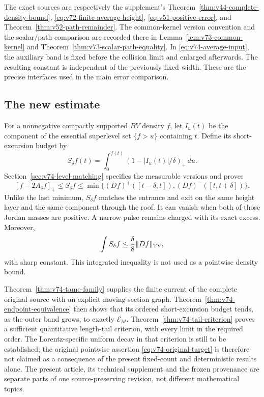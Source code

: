 \documentclass[11pt,reqno]{amsart}
\numberwithin{equation}{section}
\theoremstyle{definition}
\theoremstyle{remark}\newtheorem{remark}[theorem]{Remark}
\begin{document}
The exact sources are respectively the supplement's
Theorem~\ref{thm:v44-complete-density-bound},
\eqref{eq:v72-finite-average-height},
\eqref{eq:v51-positive-error}, and
Theorem~\ref{thm:v52-path-remainder}. The common-kernel version
convention and the scalar/path comparison are recorded there in
Lemma~\ref{lem:v73-common-kernel} and
Theorem~\ref{thm:v73-scalar-path-equality}.
In \eqref{eq:v74-average-input}, the auxiliary band is fixed before
the collision limit and enlarged afterwards. The resulting constant
is independent of the previously fixed width. These are the precise
interfaces used in the main error comparison.

\subsection{The new estimate}
For a nonnegative compactly supported $BV$ density $f$, let $I_u(t)$
be the component of the essential superlevel set $\{f>u\}$ containing
$t$. Define its short-excursion budget by
\[
 S_\delta f(t)=\int_0^{f(t)}(1-|I_u(t)|/\delta)_+\,du.
\]
Section~\ref{sec:v74-level-matching} specifies the measurable versions
and proves
\begin{equation}\label{eq:v74-leading-estimate}
 [f-2A_\delta f]_+\le S_\delta f
 \le\min\{(Df)^+([t-\delta,t]),(Df)^-([t,t+\delta])\}.
\end{equation}
Unlike the last minimum, $S_\delta f$ matches the entrance and exit
on the same height layer and the same component through the roof.
It can vanish when both of those Jordan masses are positive.
A narrow pulse remains charged with its exact excess.
Moreover,
\[
 \int S_\delta f\le\frac\delta8\|Df\|_{\operatorname{TV}},
\]
with sharp constant. This integrated inequality is not used as a
pointwise density bound.

Theorem~\ref{thm:v74-tame-family} supplies the finite current of the
complete original source with an explicit moving-section graph.
Theorem~\ref{thm:v74-endpoint-equivalence} then shows that its
ordered short-excursion budget tends, as the outer band grows, to
exactly $\mathcal E_M$. Theorem~\ref{thm:v74-tail-criterion} proves
a sufficient quantitative length-tail criterion, with every limit
in the required order. The Lorentz-specific uniform decay in that
criterion is still to be established; the original pointwise
assertion \eqref{eq:v74-original-target} is therefore not claimed
as a consequence of the present fixed-count and deterministic
results alone. The present article, its technical supplement and
the frozen provenance are separate parts of one source-preserving
revision, not different mathematical topics.






\end{document}
